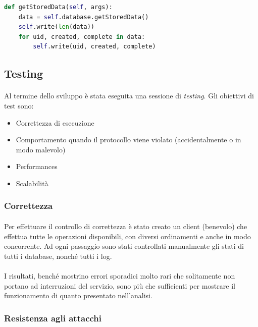 \documentclass[11pt,a4paper,english]{article}
\begin{document}
\begin{lstlisting}[language=Python, title=Dataserver]
def getStoredData(self, args):
    data = self.database.getStoredData()
    self.write(len(data))
    for uid, created, complete in data:
        self.write(uid, created, complete)
\end{lstlisting}


\subsection{Testing}

\paragraph{} Al termine dello sviluppo è stata eseguita una sessione di \emph{testing}. Gli obiettivi di test sono: \begin{itemize}
	\item Correttezza di esecuzione
	\item Comportamento quando il protocollo viene violato (accidentalmente o in modo malevolo)
	\item Performances 
	\item Scalabilità
\end{itemize}

\subsubsection{Correttezza}

\paragraph{} Per effettuare il controllo di correttezza è stato creato un client (benevolo) che effettua tutte le operazioni disponibili, con diversi ordinamenti e anche in modo concorrente. Ad ogni passaggio sono stati controllati manualmente gli stati di tutti i database, nonché tutti i log. 

\paragraph{} I risultati, benché mostrino errori sporadici molto rari che solitamente non portano ad interruzioni del servizio, sono più che sufficienti per mostrare il funzionamento di quanto presentato nell'analisi. 

\subsubsection{Resistenza agli attacchi}
\end{document}
